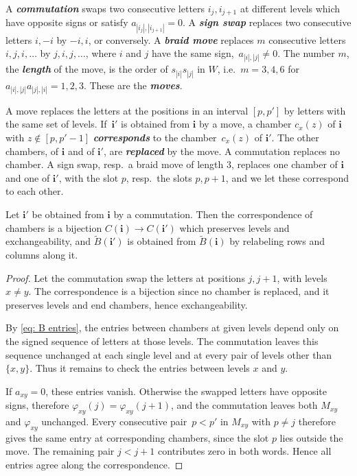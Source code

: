 \documentclass[a4paper]{amsart}
\numberwithin{equation}{section}
\theoremstyle{definition}
\theoremstyle{remark}
\newcommand{\bfi}{\mathbf{i}}
\newcommand{\tB}{\widetilde{B}}
\newcommand{\newword}[1]{\textbf{\emph{#1}}}
\begin{document}
A \newword{commutation} swaps two consecutive letters $i_j,i_{j+1}$ at different levels which have opposite signs or satisfy $a_{|i_j|,|i_{j+1}|}=0$.
A \newword{sign swap} replaces two consecutive letters $i,-i$ by $-i,i$, or conversely.
A \newword{braid move} replaces $m$ consecutive letters $i,j,i,\dots$ by $j,i,j,\dots$, where $i$ and $j$ have the same sign,~$a_{|i|,|j|}\neq0$.
The number $m$, the \newword{length} of the move, is the order of $s_{|i|}s_{|j|}$ in $W$, i.e.\ $m=3,4,6$ for $a_{|i|,|j|}a_{|j|,|i|}=1,2,3$.
These are the \newword{moves}.

A move replaces the letters at the positions in an interval $[p,p']$ by letters with the same set of levels.
If~$\bfi'$ is obtained from $\bfi$ by a move, a chamber $c_x(z)$ of $\bfi$ with $z\notin[p,p'-1]$ \newword{corresponds} to the chamber~$c_x(z)$ of $\bfi'$.
The other chambers, of $\bfi$ and of $\bfi'$, are \newword{replaced} by the move.
A commutation replaces no chamber.
A sign swap, resp.\ a braid move of length $3$, replaces one chamber of $\bfi$ and one of $\bfi'$, with the slot $p$, resp.\ the slots $p,p+1$, and we let these correspond to each other.

\begin{lemma}
  \label{lem: commutation}
  Let $\bfi'$ be obtained from $\bfi$ by a commutation.
  Then the correspondence of chambers is a bijection $C(\bfi)\to C(\bfi')$ which preserves levels and exchangeability, and $\tB(\bfi')$ is obtained from $\tB(\bfi)$ by relabeling rows and columns along it.
\end{lemma}
\begin{proof}
  Let the commutation swap the letters at positions $j,j+1$, with levels $x\neq y$.
  The correspondence is a bijection since no chamber is replaced, and it preserves levels and end chambers, hence exchangeability.

  By \eqref{eq: B entries}, the entries between chambers at given levels depend only on the signed sequence of letters at those levels.
  The commutation leaves this sequence unchanged at each single level and at every pair of levels other than $\{x,y\}$.
  Thus it remains to check the entries between levels $x$ and $y$.

  If $a_{xy}=0$, these entries vanish.
  Otherwise the swapped letters have opposite signs, therefore $\varphi_{xy}(j)=\varphi_{xy}(j+1)$, and the commutation leaves both $M_{xy}$ and $\varphi_{xy}$ unchanged.
  Every consecutive pair~$p<p'$ in $M_{xy}$ with $p\neq j$ therefore gives the same entry at corresponding chambers, since the slot $p$ lies outside the move.
  The remaining pair $j<j+1$ contributes zero in both words.
  Hence all entries agree along the correspondence.
\end{proof}
\end{document}
